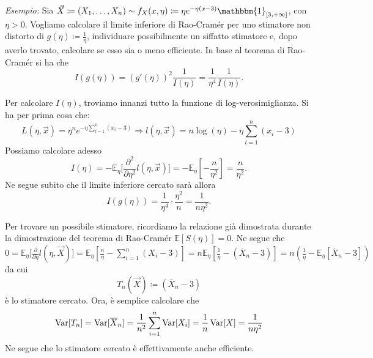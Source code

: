\\ 
\\
\textit{Esempio:} Sia $\vec{X}\coloneqq (X_1,\ldots,X_n)\sim f_X(x,\eta)\coloneqq \eta e^{-\eta(x-3)}\mathbbm{1}_{[3,+\infty]}$, con $\eta>0$. 
Vogliamo calcolare il limite inferiore di Rao-Cramér per uno stimatore non distorto di $g(\eta)\coloneqq \frac{1}{\eta}$, 
individuare possibilmente un siffatto stimatore e, dopo averlo trovato, calcolare se esso sia o meno efficiente. 
In base al teorema di Rao-Cramér si ha che 
$$I(g(\eta))=\left(g'(\eta)\right)^2\frac{1}{I(\eta)}=\frac{1}{\eta^4}\frac{1}{I(\eta)}.$$ 

Per calcolare $I(\eta)$, troviamo innanzi tutto la funzione di log-verosimiglianza. 
Si ha per prima cosa che: \\
$$L(\eta, \vec{x})=\eta^n e^{-\eta\sum_{i=1}^n (x_i-3)} \Rightarrow l(\eta,\vec{x})=n\log(\eta)-\eta\sum_{i=1}^n (x_i-3)$$ Possiamo calcolare adesso $$I(\eta)=-\mathbb{E}_\eta \Big[\frac{\partial^2}{\partial\eta^2} l(\eta,\vec{x})\Big]=-\mathbb{E}_\eta [-\frac{n}{\eta^2}]=\frac{n}{\eta^2}.$$ 
Ne segue subito che il limite inferiore cercato sarà allora
 $$I(g(\eta))=\frac{1}{\eta^4}\cdot \frac{\eta^2}{n}=\frac{1}{n\eta^2}.$$

Per trovare un possibile stimatore, ricordiamo la relazione già dimostrata durante la dimostrazione del teorema di Rao-Cramér $\mathbb{E}[S(\eta)]=0$. 
Ne segue che 
$0=\mathbb{E}_\eta\Big[\frac{\partial}{\partial\eta}l(\eta,\vec{X})\Big]=
\mathbb{E}_\eta[\frac{n}{\eta}-\sum_{i=1}^n (X_i-3)]=
n\mathbb{E}_\eta[\frac{1}{\eta} -(\overline{X}_n-3)]=
n\left(\frac{1}{\eta}-\mathbb{E}_\eta[\overline{X}_n-3]\right)$ da cui  $$T_n(\vec{X})\coloneqq (\overline{X}_n-3)$$ è lo stimatore cercato. Ora, è semplice calcolare che $$\operatorname{Var}[T_n]=\operatorname{Var}[\overline{X}_n]=\frac{1}{n^2}\sum_{i=1}^n \operatorname{Var}[X_i]=\frac{1}{n}\operatorname{Var}[X]=\frac{1}{n\eta^2}$$ Ne segue che lo stimatore cercato è effettivamente anche efficiente.